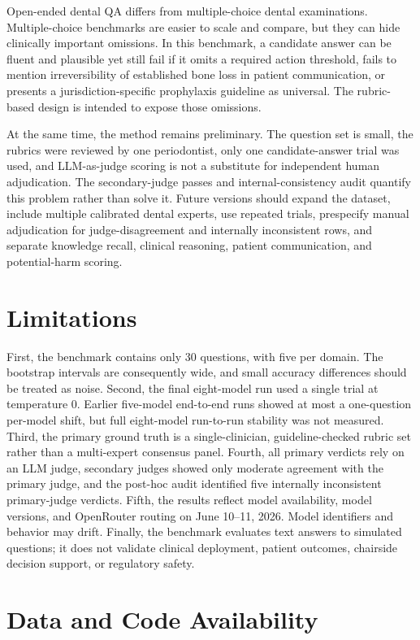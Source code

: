 \documentclass[11pt]{article}
\begin{document}
Open-ended dental QA differs from multiple-choice dental examinations.
Multiple-choice benchmarks are easier to scale and compare, but they can hide clinically important omissions.
In this benchmark, a candidate answer can be fluent and plausible yet still fail if it omits a required action threshold, fails to mention irreversibility of established bone loss in patient communication, or presents a jurisdiction-specific prophylaxis guideline as universal.
The rubric-based design is intended to expose those omissions.

At the same time, the method remains preliminary.
The question set is small, the rubrics were reviewed by one periodontist, only one candidate-answer trial was used, and LLM-as-judge scoring is not a substitute for independent human adjudication.
The secondary-judge passes and internal-consistency audit quantify this problem rather than solve it.
Future versions should expand the dataset, include multiple calibrated dental experts, use repeated trials, prespecify manual adjudication for judge-disagreement and internally inconsistent rows, and separate knowledge recall, clinical reasoning, patient communication, and potential-harm scoring.

\section{Limitations}

First, the benchmark contains only 30 questions, with five per domain.
The bootstrap intervals are consequently wide, and small accuracy differences should be treated as noise.
Second, the final eight-model run used a single trial at temperature 0.
Earlier five-model end-to-end runs showed at most a one-question per-model shift, but full eight-model run-to-run stability was not measured.
Third, the primary ground truth is a single-clinician, guideline-checked rubric set rather than a multi-expert consensus panel.
Fourth, all primary verdicts rely on an LLM judge, secondary judges showed only moderate agreement with the primary judge, and the post-hoc audit identified five internally inconsistent primary-judge verdicts.
Fifth, the results reflect model availability, model versions, and OpenRouter routing on June 10--11, 2026.
Model identifiers and behavior may drift.
Finally, the benchmark evaluates text answers to simulated questions; it does not validate clinical deployment, patient outcomes, chairside decision support, or regulatory safety.

\section{Data and Code Availability}
\end{document}
